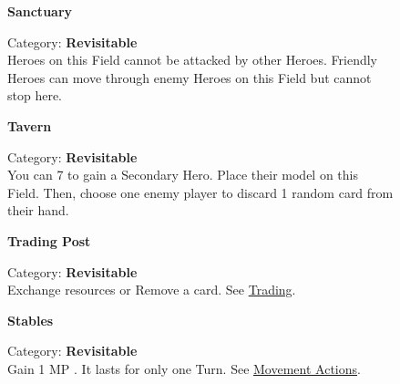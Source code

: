 \begin{figure}[H]
  \begin{minipage}[t]{0.47\textwidth}
    \vspace{0pt}
    \centering
    \textbf{Sanctuary}\par
    \caption{\small Category: \textbf{Revisitable}\\
      Heroes on this Field cannot be attacked by other Heroes.
      Friendly Heroes can move through enemy Heroes on this Field but cannot stop here.}
  \end{minipage}\hfill
  \begin{minipage}[t]{0.47\textwidth}
    \vspace{0pt}
    \centering
    \phantom{j}\textbf{Tavern}\par
    \caption{\small Category: \textbf{Revisitable}\\
      You can 
      7 
      to gain a Secondary Hero.
      Place their model on this Field.
      Then, choose one enemy player to discard 1 random card from their hand.}
  \end{minipage}
\end{figure}

\begin{figure}[H]
  \begin{minipage}[t]{0.47\textwidth}
    \vspace{0pt}
    \centering
    \hypertarget{Trading Post}{\textbf{Trading Post}}\par
    \caption{\small Category: \textbf{Revisitable}\\
      Exchange resources or Remove a card.
      See \protect\hyperlink{Trading}{Trading}.}
  \end{minipage}\hfill
  \begin{minipage}[t]{0.47\textwidth}
    \vspace{0pt}
    \centering
    \phantom{j}\textbf{Stables}\par
    \caption{\small Category: \textbf{Revisitable}\\
      Gain 1 MP .
      It lasts for only one Turn.
      See \protect\hyperlink{Movement}{Movement Actions}.
    }
  \end{minipage}
\end{figure}

